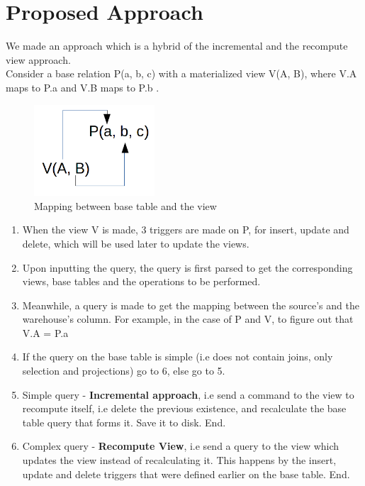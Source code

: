 \documentclass[12pt]{report}
\begin{document}
\section{Proposed Approach}
We made an approach which is a hybrid of the incremental and the recompute view approach. \\Consider a base relation P(a, b, c) with a materialized view V(A, B), where V.A maps to P.a and V.B maps to P.b .
\begin{figure}[H]
\centering \includegraphics[width=0.4\textwidth]{images/mapping.png}
\caption{Mapping between base table and the view}
\end{figure}
\begin{enumerate}
  \item When the view V is made, 3 triggers are made on P, for insert, update and delete, which will be used later to update the views.
  \item Upon inputting the query, the query is first parsed to get the corresponding views, base tables and the operations to be performed.
  \item Meanwhile, a query is made to get the mapping between the source's and the warehouse's column. For example, in the case of P and V, to figure out that V.A = P.a
  \item If the query on the base table is simple (i.e does not contain joins, only selection and projections) go to 6, else go to 5.
  \item Simple query - \textbf{Incremental approach}, i.e send a command to the view to recompute itself, i.e delete the previous existence, and recalculate the base table query that forms it. Save it to disk. End.
  \item Complex query - \textbf{Recompute View}, i.e send a query to the view which updates the view instead of recalculating it. This happens by the insert, update and delete triggers that were defined earlier on the base table. End.\\
\end{enumerate}
\end{document}
